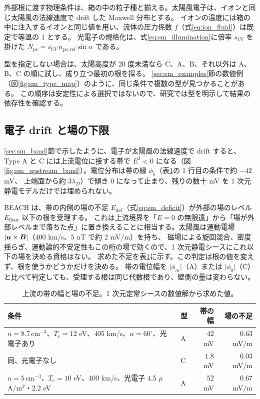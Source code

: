 外部根に渡す物理条件は、箱の中の粒子種と揃える。太陽風電子は、イオンと同じ太陽風の法線速度で drift した Maxwell 分布とする。
イオンの温度には箱の中に注入するイオンと同じ値を用い、流体の圧力係数 $f$（式\eqref{eq:ion_fluid}）は既定で等温の 1 とする。
光電子の規格化は、式\eqref{eq:sm_illumination}に倍率 $s_{UV}$ を掛けた $N_{\mathrm{pe}}=s_{UV}\,n_{\mathrm{pe,ref}}\sin\alpha$ である。

型を指定しない場合は、太陽高度が 20 度未満なら C、A、B、それ以外は A、B、C の順に試し、成り立つ最初の根を採る。
\ref{sec:sm_examples}節の数値例（図\ref{fig:sm_type_map}）のように、同じ条件で複数の型が見つかることがある\citep{SanaMishra2023}。
この順序は安定性による選択ではないので、研究では型を明示して結果の依存性を確認する。

\subsection{電子 drift と場の下限}
\label{sec:upstream_band}
\ref{sec:sm_band}節で示したように、電子が太陽風の法線速度で drift すると、Type A と C には上流電位に接する帯で
$E^2<0$ になる（図\ref{fig:sm_upstream_band}）。電位分布は帯の縁 $\phi_b$（表\ref{tab:band_deficit}の 1 行目の条件で約 $-42$ mV、
上端面から約 $3\lambda_D$）で傾き 0 になって止まり、残りの数十 mV を 1 次元静電モデルだけでは埋められない。

BEACH は、帯の内側の場の不足 $E_{\mathrm{def}}$（式\eqref{eq:sm_deficit}）が外部の場のレベル $E_{\mathrm{floor}}$ 以下の根を受理する。
これは上流境界を「$E=0$ の無限遠」から「場が外部レベルまで落ちた点」に置き換えることに相当する。太陽風は運動電場 $\lvert\bm{u}\times\bm{B}\rvert$（400 km/s、5 nT で約 2 mV/m）を持ち、
磁場による旋回混合、密度揺らぎ、運動論的不安定性もこの桁の場で効くので、1 次元静電シースにこれ以下の場を決める資格はない。
求めた不足を表\ref{tab:band_deficit}に示す。この判定は根の値を変えず、根を使うかどうかだけを決める。
帯の電位幅を $\lvert\phi_m\rvert$（A）または $\lvert\phi_0\rvert$（C）と比べて判定しても、受理する根は同じ代数根であり、壁側の量は変わらない。

\begin{table}[htbp]
\centering
\caption{上流の帯の幅と場の不足。1 次元定常シースの数値解から求めた値。}
\label{tab:band_deficit}
\begin{tabular}{llrr}
\toprule
条件 & 型 & 帯の幅 & 場の不足 \\
\midrule
$n=8.7\,\mathrm{cm^{-3}}$、$T_e=12$ eV、405 km/s、$\alpha=60^\circ$、光電子あり & A & 42 mV & 0.63 mV/m \\
同、光電子なし & C & 1.8 mV & 0.03 mV/m \\
$n=5\,\mathrm{cm^{-3}}$、$T_e=10$ eV、400 km/s、光電子 4.5 $\mu$A/m$^2$・2.2 eV & A & 52 mV & 0.67 mV/m \\
\bottomrule
\end{tabular}
\end{table}

